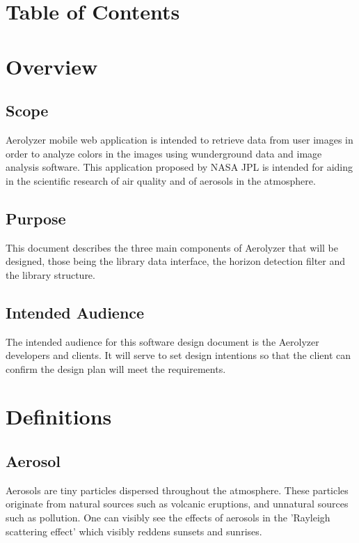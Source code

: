 \documentclass[onecolumn, draftclsnofoot,10pt, compsoc]{IEEEtran}
\begin{document}
\section{Table of Contents}
\tableofcontents
\clearpage

\begin{singlespace}
\section{Overview}
	\subsection{Scope}
		Aerolyzer mobile web application is intended to retrieve data from user images in order to analyze colors in the images using wunderground data and image analysis software. This application proposed by NASA JPL is intended for aiding in the scientific research of air quality and of aerosols in the atmosphere. 
	\subsection{Purpose}
		This document describes the three main components of Aerolyzer that will be designed, those being the library data interface, the horizon detection filter and the library structure. 
	\subsection{Intended Audience}
		The intended audience for this software design document is the Aerolyzer developers and clients. It will serve to set design intentions so that the client can confirm the design plan will meet the requirements.

\section{Definitions}
	
	\subsection{Aerosol}\label{def:aerosol}
		Aerosols are tiny particles dispersed throughout the atmosphere.
		These particles originate from natural sources such as volcanic eruptions, and unnatural sources such as pollution. 
		One can visibly see the effects of aerosols in the 'Rayleigh scattering effect'  which visibly reddens sunsets and sunrises. \cite{allen_2015}
	

\end{singlespace}
\end{document}
